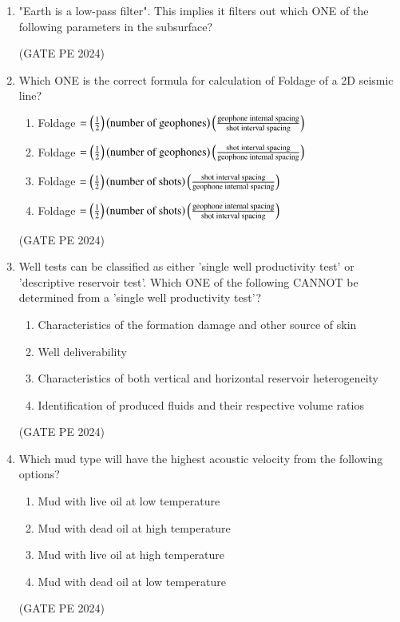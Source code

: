 \documentclass[journal,12pt,onecolumn]{IEEEtran}
\theoremstyle{remark}
\begin{document}
\begin{enumerate}
\item "Earth is a low-pass filter". This implies it filters out which ONE of the following parameters in the subsurface?
\begin{enumerate}
\end{enumerate}
\hfill{(GATE PE 2024)}

\item Which ONE is the correct formula for calculation of Foldage of a 2D seismic line?
\begin{enumerate}
    \item Foldage $=\left(\frac{1}{2}\right)\left(\text{number of geophones}\right)\left(\frac{\text{geophone internal spacing}}{\text{shot interval spacing}}\right)$
    \item Foldage $=\left(\frac{1}{2}\right)\left(\text{number of geophones}\right)\left(\frac{\text{shot interval spacing}}{\text{geophone internal spacing}}\right)$
    \item Foldage $=\left(\frac{1}{2}\right)\left(\text{number of shots}\right)\left(\frac{\text{shot interval spacing}}{\text{geophone internal spacing}}\right)$
    \item Foldage $=\left(\frac{1}{2}\right)\left(\text{number of shots}\right)\left(\frac{\text{geophone internal spacing}}{\text{shot interval spacing}}\right)$
\end{enumerate}
\hfill{(GATE PE 2024)}

\item Well tests can be classified as either 'single well productivity test' or 'descriptive reservoir test'. Which ONE of the following CANNOT be determined from a 'single well productivity test'?
\begin{enumerate}
    \item Characteristics of the formation damage and other source of skin
    \item Well deliverability
    \item Characteristics of both vertical and horizontal reservoir heterogeneity
    \item Identification of produced fluids and their respective volume ratios
\end{enumerate}
\hfill{(GATE PE 2024)}

\item Which mud type will have the highest acoustic velocity from the following options?
\begin{enumerate}
    \item Mud with live oil at low temperature
    \item Mud with dead oil at high temperature
    \item Mud with live oil at high temperature
    \item Mud with dead oil at low temperature
\end{enumerate}
\hfill{(GATE PE 2024)}


\end{enumerate}
\end{document}
